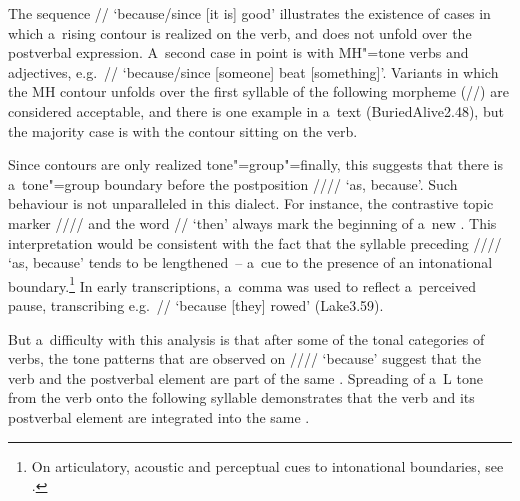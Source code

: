 The sequence // ‘because/since [it is] good’ illustrates the
existence of cases in which a~rising contour is realized on the verb, and does not unfold over the
postverbal expression. A~second case in point is with MH"=tone verbs and adjectives, e.g.~//
‘because/since [someone] beat [something]’. Variants in which the MH contour unfolds over the first
syllable of the following morpheme (//) are considered acceptable, and
there is one example in a~text (BuriedAlive2.48), but the majority case is with the contour
sitting on the verb. 

Since contours are only realized tone"=group"=finally, this suggests that there is a~tone"=group boundary before the postposition //// ‘as, because’. Such behaviour is not unparalleled in this dialect. For instance, the contrastive topic marker //// and the
word // ‘then’ always mark the beginning of a~new . This interpretation would be
consistent with the fact that the syllable preceding //// ‘as, because’ tends to be lengthened~-- a~cue to the presence of an intonational {boundary}.\footnote{On articulatory, acoustic and perceptual cues to intonational boundaries, see \citet{byrdElastic2003}.} In early transcriptions, a~comma was used
to reflect a~perceived pause, transcribing e.g.~// ‘because [they] rowed’ (Lake3.59).

But a~difficulty with this analysis is that after some of the tonal categories of verbs, the tone patterns that are observed on //// ‘because’ suggest that
the verb and the postverbal element are part of the same . Spreading of a~L tone from the verb onto the following syllable demonstrates that the verb and its postverbal element are integrated into the same . 

